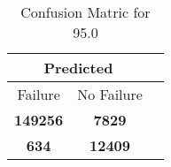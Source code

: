 \begin{table}[] 
\caption{Confusion Matric for 95.0} 
\label{Table: Prediction Accuracy-None95.0RandomForest100EKF-ignoreReflection-Reflection} 
\centering 
\begin{tabular} 
 {@{}ccc@{}} 
\toprule 
\multicolumn{2}{c}{\textbf{Predicted}}
 \\ \midrule 
\multicolumn{1}{|c|}{Failure} & 
\multicolumn{1}{c|}{No Failure}
 \\ \midrule 
\multicolumn{1}{|c|}{\color{green}\textbf{149256}} & 
\multicolumn{1}{c|}{\color{red}\textbf{7829}}
 \\ \midrule 
\multicolumn{1}{|c|}{\color{red}\textbf{634}} & 
\multicolumn{1}{c|}{\color{green}\textbf{12409}}
 \\ \bottomrule 
\end{tabular} 
\end{table} 
